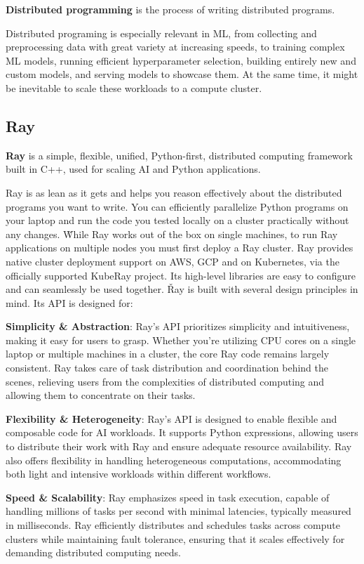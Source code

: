 \textbf{Distributed programming} is the process of writing distributed programs.
\ed

Distributed programing is especially relevant in ML, from collecting and preprocessing data with great variety at
increasing speeds, to training complex ML models, running efficient hyperparameter selection, building
entirely new and custom models, and serving models to showcase them. At the same time, it might be inevitable to
scale these workloads to a compute cluster.

\subsection{Ray}

\bd[Ray]
\textbf{Ray} is a simple, flexible, unified, Python-first, distributed computing framework built in C++, used for
scaling AI and Python applications.
\ed

Ray is as lean as it gets and helps you reason effectively about the distributed programs you want to write. You can
efficiently parallelize Python programs on your laptop and run the code you tested locally on a cluster practically
without any changes. \v

While Ray works out of the box on single machines, to run Ray applications on multiple nodes you
must first deploy a Ray cluster. Ray provides native cluster deployment support on AWS, GCP and on Kubernetes, via
the officially supported KubeRay project. Its high-level libraries are easy to configure and can seamlessly be used
together. \v

Ray is built with several design principles in mind. Its API is designed for:
\bit
\item \textbf{Simplicity \& Abstraction}: Ray's API prioritizes simplicity and intuitiveness, making it easy for 
users to grasp. Whether you're utilizing CPU cores on a single laptop or multiple machines in a cluster, the core Ray
code remains largely consistent. Ray takes care of task distribution and coordination behind the scenes, relieving 
users from the complexities of distributed computing and allowing them to concentrate on their tasks.
\item \textbf{Flexibility \& Heterogeneity}: Ray's API is designed to enable flexible and composable code for AI 
workloads. It supports Python expressions, allowing users to distribute their work with Ray and ensure adequate 
resource availability. Ray also offers flexibility in handling heterogeneous computations, accommodating both light 
and intensive workloads within different workflows.
\item \textbf{Speed \& Scalability}: Ray emphasizes speed in task execution, capable of handling millions of tasks 
per second with minimal latencies, typically measured in milliseconds. Ray efficiently distributes and schedules 
tasks across compute clusters while maintaining fault tolerance, ensuring that it scales effectively for demanding 
distributed computing needs.
\eit

